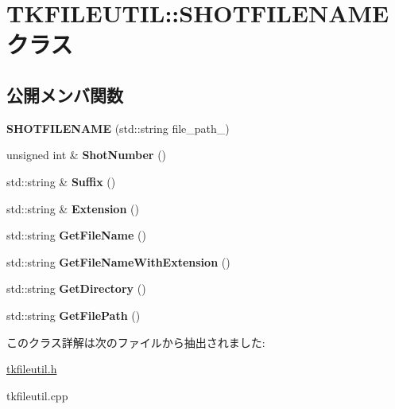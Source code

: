 \hypertarget{class_t_k_f_i_l_e_u_t_i_l_1_1_s_h_o_t_f_i_l_e_n_a_m_e}{}\section{T\+K\+F\+I\+L\+E\+U\+T\+IL\+:\+:S\+H\+O\+T\+F\+I\+L\+E\+N\+A\+ME クラス}
\label{class_t_k_f_i_l_e_u_t_i_l_1_1_s_h_o_t_f_i_l_e_n_a_m_e}
\subsection*{公開メンバ関数}
\begin{DoxyCompactItemize}
\item 
\mbox{\label{class_t_k_f_i_l_e_u_t_i_l_1_1_s_h_o_t_f_i_l_e_n_a_m_e_a861f9e8e0995a90ec76f9f256a896edd}} 
{\bfseries S\+H\+O\+T\+F\+I\+L\+E\+N\+A\+ME} (std\+::string file\+\_\+path\+\_\+)
\item 
\mbox{\label{class_t_k_f_i_l_e_u_t_i_l_1_1_s_h_o_t_f_i_l_e_n_a_m_e_a428c708a7e372ff4b4e86e8eff66b3a3}} 
unsigned int \& {\bfseries Shot\+Number} ()
\item 
\mbox{\label{class_t_k_f_i_l_e_u_t_i_l_1_1_s_h_o_t_f_i_l_e_n_a_m_e_adc23c9888f4b386bc13232a897b1e08f}} 
std\+::string \& {\bfseries Suffix} ()
\item 
\mbox{\label{class_t_k_f_i_l_e_u_t_i_l_1_1_s_h_o_t_f_i_l_e_n_a_m_e_a5feb9f8c9d45ecd63c4a6a3b04d8f0a3}} 
std\+::string \& {\bfseries Extension} ()
\item 
\mbox{\label{class_t_k_f_i_l_e_u_t_i_l_1_1_s_h_o_t_f_i_l_e_n_a_m_e_a117febf22182245999d54b2275dce157}} 
std\+::string {\bfseries Get\+File\+Name} ()
\item 
\mbox{\label{class_t_k_f_i_l_e_u_t_i_l_1_1_s_h_o_t_f_i_l_e_n_a_m_e_ab86cd404a78edefff8d78910578af6be}} 
std\+::string {\bfseries Get\+File\+Name\+With\+Extension} ()
\item 
\mbox{\label{class_t_k_f_i_l_e_u_t_i_l_1_1_s_h_o_t_f_i_l_e_n_a_m_e_a018228026b6c0bdc2f7e50d084c58393}} 
std\+::string {\bfseries Get\+Directory} ()
\item 
\mbox{\label{class_t_k_f_i_l_e_u_t_i_l_1_1_s_h_o_t_f_i_l_e_n_a_m_e_adecbef97489eafba083b43e5118e11ce}} 
std\+::string {\bfseries Get\+File\+Path} ()
\end{DoxyCompactItemize}


このクラス詳解は次のファイルから抽出されました\+:\begin{DoxyCompactItemize}
\item 
\hyperlink{tkfileutil_8h}{tkfileutil.\+h}\item 
tkfileutil.\+cpp\end{DoxyCompactItemize}
